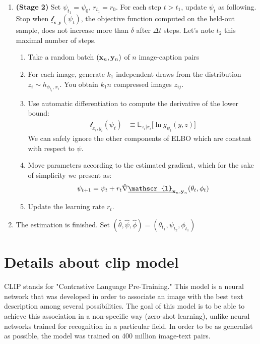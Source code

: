 \documentclass{article}
\begin{document}
\begin{appendix}
\begin{multicols}{2}
\begin{enumerate}
    \item \textbf{(Stage 2)} Set $\psi_{t_1}=\psi_0$, $r_{t_1}=r_0$. For each step $t>t_{1}$, update $\psi_t$ as following. Stop when $\underline{\mathscr{l}}_{\bar{\mathbf{x}},\bar{\mathbf{y}}}(\psi_t)$, the objective function computed on the held-out sample, does not increase more than $\delta$ after $\Delta t$ steps.  Let's note $t_2$ this maximal number of steps.
    
    \begin{enumerate}
    \item Take a random batch $(\mathbf{x}_n,\mathbf{y}_n)$ of $n$ image-caption pairs
    \item For each image, generate $k_1$ independent draws from the distribution $z_i\sim h_{\phi_{t_1},x_i}$. You obtain $k_1n$ compressed images $z_{ij}$.
    \item Use automatic differentiation to compute the derivative of the lower bound: \begin{align*}
    \underline{\mathscr{l}}_{x_i,y_i}(\psi_t) & \equiv \mathbb{E}_{z_i|x_i} \Big[\ln g_{\psi_t}(y,z)\Big]
    \end{align*}
    We can safely ignore the other components of ELBO which are constant with respect to $\psi$.
    \item Move parameters according to the estimated gradient, which for the sake of simplicity we present as: $$\psi_{t+1}=\psi_{t}+r_t\hat{\nabla}\underline{\mathscr{l}}_{\xn,\yn}(\theta_{t},\phi_{t})$$
    \item Update the learning rate $r_t$.
    \end{enumerate}
    \item The estimation is finished. Set $(\hat \theta, \hat \psi, \hat \phi)=(\theta_{t_1}, \psi_{t_2}, \phi_{t_1})$
\end{enumerate}

\end{multicols}

\clearpage

\section{Details about \gls{clip} model} \label{app:more-CLIP}

\begin{multicols}{2}

CLIP stands for "Contrastive Language Pre-Training." This model is a neural network that was developed in order to associate an image with the best text description among several possibilities. The goal of this model is to be able to achieve this association in a non-specific way (zero-shot learning), unlike neural networks trained for recognition in a particular field. In order to be as generalist as possible, the model was trained on 400 million image-text pairs. 


\end{multicols}
\end{appendix}
\end{document}
